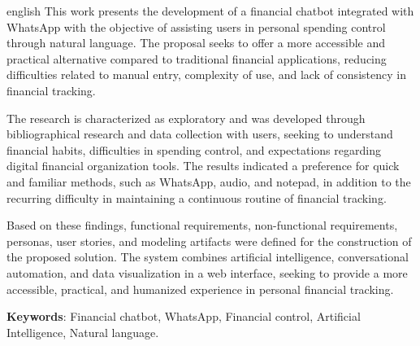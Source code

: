 \begin{resumo}[Abstract]
\begin{otherlanguage*}{english}
This work presents the development of a financial chatbot integrated with WhatsApp with the objective of assisting users in personal spending control through natural language. The proposal seeks to offer a more accessible and practical alternative compared to traditional financial applications, reducing difficulties related to manual entry, complexity of use, and lack of consistency in financial tracking.

The research is characterized as exploratory and was developed through bibliographical research and data collection with users, seeking to understand financial habits, difficulties in spending control, and expectations regarding digital financial organization tools. The results indicated a preference for quick and familiar methods, such as WhatsApp, audio, and notepad, in addition to the recurring difficulty in maintaining a continuous routine of financial tracking.

Based on these findings, functional requirements, non-functional requirements, personas, user stories, and modeling artifacts were defined for the construction of the proposed solution. The system combines artificial intelligence, conversational automation, and data visualization in a web interface, seeking to provide a more accessible, practical, and humanized experience in personal financial tracking.

\textbf{Keywords}: Financial chatbot, WhatsApp, Financial control, Artificial Intelligence, Natural language.
\end{otherlanguage*}
\end{resumo}
